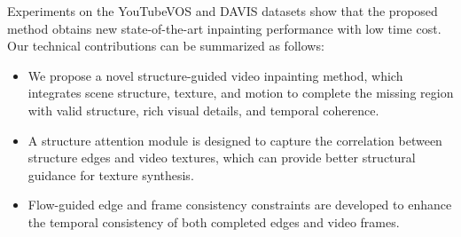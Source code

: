 




%
Experiments on the YouTubeVOS and DAVIS datasets show that the proposed method obtains new state-of-the-art inpainting performance with low time cost.
%
Our technical contributions can be summarized as follows:
\begin{itemize}
	\item We propose a novel structure-guided video inpainting method, which integrates scene structure, texture, and motion to complete the missing region with valid structure, rich visual details, and temporal coherence.
	\item A structure attention module is designed to capture the correlation between structure edges and video textures, which can provide better structural guidance for texture synthesis. %
	\item Flow-guided edge and frame consistency constraints are developed to enhance the temporal consistency of both completed edges and video frames.   
\end{itemize}


